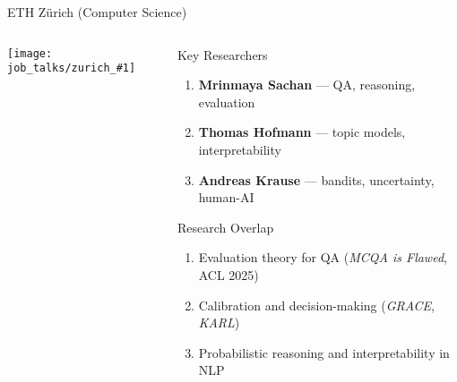 \documentclass[compress]{beamer}
\newcommand{\gfxz}[2]{
	\begin{center}
		\texttt{[image: job\_talks/zurich\_\#1]}
	\end{center}
}
\begin{document}
\begin{frame}{ETH Z\"urich (Computer Science)}
\begin{columns}
  \begin{column}{0.3\textwidth}
    \gfxz{eth}{.9}
  \end{column}
  \begin{column}{0.75\textwidth}
    \begin{block}{Key Researchers}
      \begin{enumerate}
        \item \textbf{Mrinmaya Sachan} — QA, reasoning, evaluation  
        \item \textbf{Thomas Hofmann} — topic models, interpretability  
        \item \textbf{Andreas Krause} — bandits, uncertainty, human-AI
      \end{enumerate}
    \end{block}

    \begin{block}{Research Overlap}
      \begin{enumerate}
        \item Evaluation theory for QA (\textit{MCQA is Flawed}, ACL 2025)
        \item Calibration and decision-making (\textit{GRACE}, \textit{KARL})
        \item Probabilistic reasoning and interpretability in NLP
      \end{enumerate}
    \end{block}
  \end{column}
\end{columns}
\end{frame}
\end{document}
